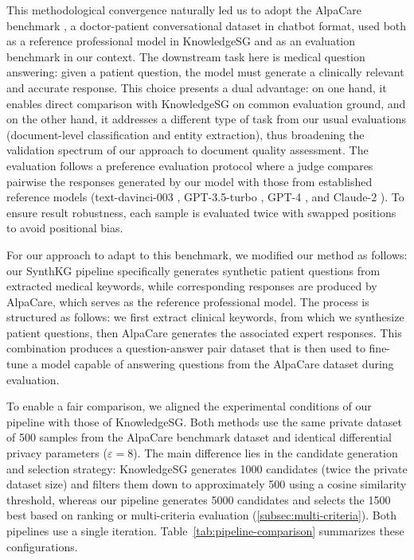 This methodological convergence naturally led us to adopt the AlpaCare benchmark \cite{zhang2023alpacare}, a doctor-patient conversational dataset in chatbot format, used both as a reference professional model in KnowledgeSG and as an evaluation benchmark in our context.
The downstream task here is medical question answering: given a patient question, the model must generate a clinically relevant and accurate response.
This choice presents a dual advantage: on one hand, it enables direct comparison with KnowledgeSG on common evaluation ground, and on the other hand, it addresses a different type of task from our usual evaluations (document-level classification and entity extraction), thus broadening the validation spectrum of our approach to document quality assessment.
The evaluation follows a preference evaluation protocol where a judge compares pairwise the responses generated by our model with those from established reference models (text-davinci-003 \cite{OpenAI2022TextDavinci003}, GPT-3.5-turbo \cite{OpenAI2022GPT35Turbo}, GPT-4 \cite{noauthor_gpt-4_nodate}, and Claude-2 \cite{Anthropic2023Claude2}). To ensure result robustness, each sample is evaluated twice with swapped positions to avoid positional bias.

For our approach to adapt to this benchmark, we modified our method as follows: our SynthKG pipeline specifically generates synthetic patient questions from extracted medical keywords, while corresponding responses are produced by AlpaCare, which serves as the reference professional model. The process is structured as follows: we first extract clinical keywords, from which we synthesize patient questions, then AlpaCare generates the associated expert responses. This combination produces a question-answer pair dataset that is then used to fine-tune a model capable of answering questions from the AlpaCare dataset during evaluation.

To enable a fair comparison, we aligned the experimental conditions of our pipeline with those of KnowledgeSG.
Both methods use the same private dataset of \num{500} samples from the AlpaCare benchmark dataset and identical differential privacy parameters ($\varepsilon = 8$).
The main difference lies in the candidate generation and selection strategy: KnowledgeSG generates \num{1000} candidates (twice the private dataset size) and filters them down to approximately \num{500} using a cosine similarity threshold, whereas our pipeline generates \num{5000} candidates and selects the \num{1500} best based on \score ranking or multi-criteria evaluation (\autoref{subsec:multi-criteria}).
Both pipelines use a single iteration.
Table~\ref{tab:pipeline-comparison} summarizes these configurations.

